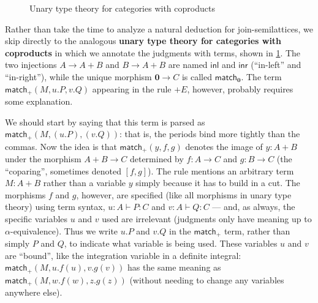 \documentclass{book}
\def\idfunc{\mathsf{id}}
\let\types\vdash
\def\type{\;\ftype}
\def\plusE{\mathord{+}E}
\def\plusI{\mathord{+}I}
\def\inl{\mathsf{inl}}
\def\inr{\mathsf{inr}}
\def\case{\mathsf{match}_+}
\def\match{\mathsf{match}}
\def\zero{\mathbf{0}}
\def\zeroE{\mathbf{0}E}
\def\abort{\match_{\zero}}
\begin{document}
\begin{figure}
  \centering
  \caption{Unary type theory for categories with coproducts}
  \label{fig:catcoprod}
\end{figure}

Rather than take the time to analyze a natural deduction for join-semilattices, we skip directly to the analogous \textbf{unary type theory for categories with coproducts} in which we annotate the judgments with terms, shown in \cref{fig:catcoprod}.
The two injections $A\to A+B$ and $B\to A+B$ are named $\inl$ and $\inr$ (``in-left'' and ``in-right''), while the unique morphism $\zero \to C$ is called $\abort$.
The term $\case(M,u.P,v.Q)$ appearing in the rule $\plusE$, however, probably requires some explanation.

We should start by saying that this term is parsed as $\case(M,(u.P),(v.Q))$: that is, the periods bind more tightly than the commas.
Now the idea is that $\case(y,f,g)$ denotes the image of $y:A+B$ under the morphism $A+B\to C$ determined by $f:A\to C$ and $g:B\to C$ (the ``coparing'', sometimes denoted $[f,g]$).
The rule mentions an arbitrary term $M:A+B$ rather than a variable $y$ simply because it has to build in a cut.
The morphisms $f$ and $g$, however, are specified (like all morphisms in unary type theory) using term syntax, $u:A\types P:C$ and $v:A\types Q:C$ --- and, as always, the specific variables $u$ and $v$ used are irrelevant (judgments only have meaning up to $\alpha$-equivalence).
Thus we write $u.P$ and $v.Q$ in the $\case$ term, rather than simply $P$ and $Q$, to indicate what variable is being used.
These variables $u$ and $v$ are ``bound'', like the integration variable in a definite integral: $\case(M,u.f(u),v.g(v))$ has the same meaning as $\case(M,w.f(w),z.g(z))$ (without needing to change any variables anywhere else).
\end{document}
